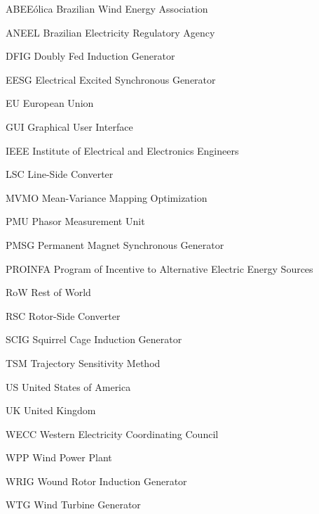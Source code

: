 \documentclass[
12pt,		%
openright,	%
twoside,  %
a4paper,			%
chapter=TITLE,		%
brazil,				%
french,				%
spanish,			%
english				%
]{USPSC}
\begin{document}
\listoftables*
\cleardoublepage


\begin{siglas}
    \item[ABEE\'olica] Brazilian Wind Energy Association
    \item[ANEEL] Brazilian Electricity Regulatory Agency
    \item[DFIG] Doubly Fed Induction Generator
    \item[EESG] Electrical Excited Synchronous Generator
    \item[EU] European Union
    \item[GUI] Graphical User Interface
	\item[IEEE] Institute of Electrical and Electronics Engineers
	\item[LSC] Line-Side Converter
	\item[MVMO] Mean-Variance Mapping Optimization
	\item[PMU] Phasor Measurement Unit
	\item[PMSG] Permanent Magnet Synchronous Generator
    \item[PROINFA] Program of Incentive to Alternative Electric Energy Sources
    \item[RoW] Rest of World
    \item[RSC] Rotor-Side Converter
    \item[SCIG] Squirrel Cage Induction Generator
    \item[TSM] Trajectory Sensitivity Method
    \item[US] United States of America
    \item[UK] United Kingdom
    \item[WECC] Western Electricity Coordinating Council
    \item[WPP] Wind Power Plant
    \item[WRIG] Wound Rotor Induction Generator
    \item[WTG] Wind Turbine Generator

	
\end{siglas}
\end{document}
